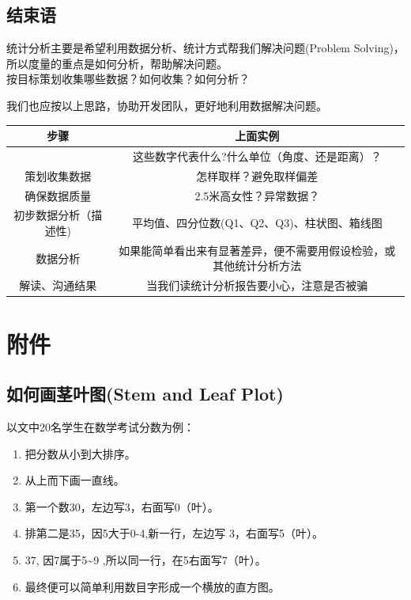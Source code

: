 \hypertarget{ux7bb1ux7ebfux56fe-box-and-whisker-plot}{%
\subsection{结束语}\label{ux7bb1ux7ebfux56fe-box-and-whisker-plot}}

统计分析主要是希望利用数据分析、统计方式帮我们解决问题(Problem
Solving)，所以度量的重点是如何分析，帮助解决问题。\\
按目标策划收集哪些数据？如何收集？如何分析？

我们也应按以上思路，协助开发团队，更好地利用数据解决问题。



\begin{tabular}{|c|c|}
\hline
步骤&上面实例 \\
\hline
\:&这些数字代表什么?什么单位（角度、还是距离）？ \\
\hline
策划收集数据&怎样取样？避免取样偏差 \\
\hline
确保数据质量&2.5米高女性？异常数据？ \\
\hline
初步数据分析（描述性)&平均值、四分位数(Q1、Q2、Q3)、柱状图、箱线图 \\
\hline
数据分析&如果能简单看出来有显著差异，便不需要用假设检验，或其他统计分析方法\\
\hline
解读、沟通结果&当我们读统计分析报告要小心，注意是否被骗 \\
\hline
\end{tabular}


\hypertarget{ux9644ux4ef6}{%
\section{附件}\label{ux9644ux4ef6}}

\hypertarget{ux5982ux4f55ux753bux830eux53f6ux56festem-and-leaf-plot}{%
\subsection{如何画茎叶图(Stem and Leaf Plot)}\label{ux5982ux4f55ux753bux830eux53f6ux56festem-and-leaf-plot}}

以文中20名学生在数学考试分数为例：

\begin{enumerate}
\tightlist
\item
  把分数从小到大排序。
\item
  从上而下画一直线。
\item
  第一个数30，左边写3，右面写0（叶）。
\item
  排第二是35，因5大于0-4,新一行，左边写 3，右面写5（叶）。
\item
  37, 因7属于5\textasciitilde{}9 ,所以同一行，在5右面写7（叶）。
\item
  最终便可以简单利用数目字形成一个横放的直方图。
\end{enumerate}


